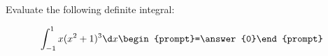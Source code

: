 \documentclass{ximera}
\author{Jim Talamo}
\begin{document}
\begin{exercise}
Evaluate the following definite integral:

\[
\int_{-1}^{1} x(x^2+1)^3 \d x 
\begin{prompt}=\answer{0}\end{prompt}
\]
\end{exercise}
\end{document}
